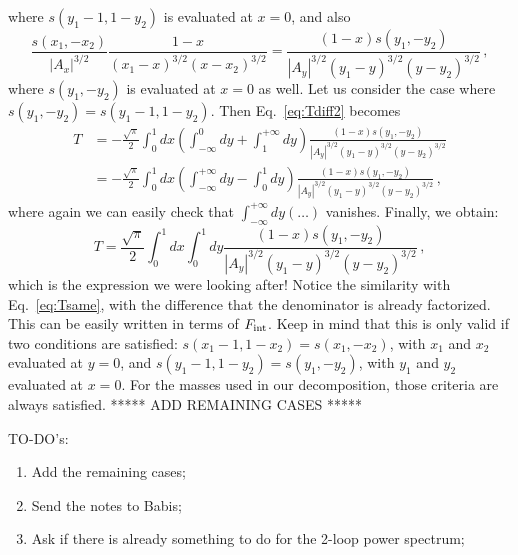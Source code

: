 \documentclass[twoside]{article}
\begin{document}
where $s(y_1-1,1-y_2)$ is evaluated at $x=0$,
and also
\begin{equation}
\frac{s(x_1,-x_2)}{|A_x|^{3/2}} \frac{1-x}{(x_1-x)^{3/2}(x-x_2)^{3/2}} = \frac{(1-x)s(y_1,-y_2)}{|A_y|^{3/2} (y_1-y)^{3/2}(y-y_2)^{3/2}}\,,
\end{equation}
where $s(y_1,-y_2)$ is evaluated at $x=0$ as well.
Let us consider the case where $s(y_1,-y_2) = s(y_1-1,1-y_2)$. Then Eq.~\eqref{eq:Tdiff2} becomes
\begin{equation}
  \label{eq:ypartT}
\begin{split}
T&=-\frac{\sqrt{\pi}}{2}\int_0^1 dx \left(\int_{-\infty}^0 dy + \int_{1}^{+\infty}dy\right)
\frac{(1-x)s(y_1,-y_2)}{|A_y|^{3/2} (y_1-y)^{3/2}(y-y_2)^{3/2}}\\
&= -\frac{\sqrt{\pi}}{2}\int_0^1 dx \left(\int_{-\infty}^{+\infty} dy - \int_{0}^1dy\right)
\frac{(1-x)s(y_1,-y_2)}{|A_y|^{3/2} (y_1-y)^{3/2}(y-y_2)^{3/2}}\,,
\end{split}
\end{equation}
where again we can easily check that $\int_{-\infty}^{+\infty} dy (\ldots)$ vanishes. Finally, we obtain:
\begin{equation}
T = \frac{\sqrt{\pi}}{2}\int_0^1 dx \int_{0}^1dy \frac{(1-x)s(y_1,-y_2)}{|A_y|^{3/2} (y_1-y)^{3/2}(y-y_2)^{3/2}}\,,
\end{equation}
which is the expression we were looking after! Notice the similarity with Eq.~\eqref{eq:Tsame}, with the difference that the denominator is already factorized. This can be easily written in terms of $F_{\rm int}$. Keep in mind that this is only valid if two conditions are satisfied: $s(x_1-1,1-x_2)=s(x_1,-x_2)$, with $x_1$ and $x_2$ evaluated at $y=0$, and $s(y_1-1,1-y_2)=s(y_1,-y_2)$, with $y_1$ and $y_2$ evaluated at $x=0$. For the masses used in our decomposition, those criteria are always satisfied. 
***** ADD REMAINING CASES *****

TO-DO's:
\begin{enumerate}
\item Add the remaining cases;
\item Send the notes to Babis;
\item Ask if there is already something to do for the 2-loop power spectrum;
\end{enumerate}
\end{document}
